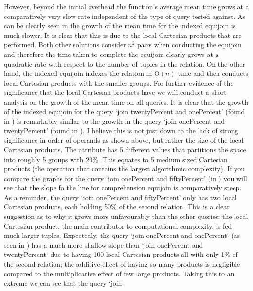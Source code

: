 However, beyond the initial overhead the
function's average mean time grows at a comparatively very slow rate independent
of the type of query tested against. As can be clearly seen in
 the growth of the mean time
for the indexed equijoin is much slower. It is clear that this is due to the
local Cartesian products that are performed. Both other solutions consider $n^2$
pairs when conducting the equijoin and therefore the time taken to complete the
equijoin clearly grows at a quadratic rate with respect to the number of tuples
in the relation. On the other hand, the indexed equijoin indexes the relation in
$\mathrm{O}(n)$ time and then conducts local Cartesian products with the smaller
groups. For further evidence of the significance that the local Cartesian
products have we will conduct a short analysis on the growth of the mean time on
all queries. It is clear that the growth of the indexed equijoin for the query
`join twentyPercent and onePercent' (found in
) is remarkably similar to the growth
in the query `join onePercent and twentyPercent' (found in
). I believe this is not
just down to the lack of strong significance in order of operands as shown
above, but rather the size of the local Cartesian products. The attribute
 has 5 different values that partitions the
space into roughly 5 groups with 20\%. This equates to 5 medium sized Cartesian
products (the operation that contains the largest algorithmic complexity). If
you compare the graphs for the query `join onePercent and fiftyPercent' (in
) you will see that the slope
fo the line for comprehension equijoin is comparatively steep. As a reminder,
the query `join onePercent and fiftyPercent' only has two local Cartesian
products, each holding 50\% of the second relation. This is a clear suggestion
as to why it grows more unfavourably than the other queries: the local Cartesian
product, the main contributor to computational complexity, is fed much larger
tuples. Expectedly, the query `join onePercent and onePercent` (as seen in
) has a much more shallow slope
than `join onePercent and twentyPercent` due to having 100 local Cartesian
products all with only 1\% of the second relation; the additive effect of
having so many products is negligible compared to the multiplicative effect of
few large products. Taking this to an extreme we can see that the query `join

